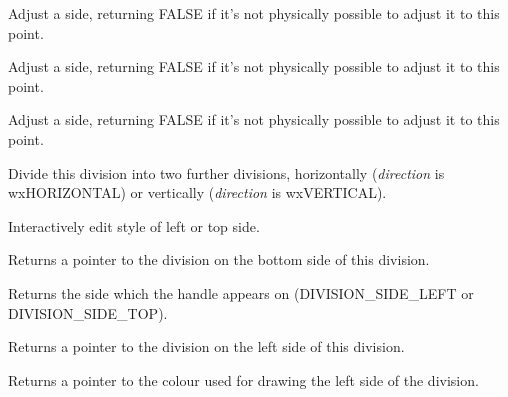 
Adjust a side, returning FALSE if it's not physically possible to adjust it to this point.



Adjust a side, returning FALSE if it's not physically possible to adjust it to this point.



Adjust a side, returning FALSE if it's not physically possible to adjust it to this point.

\label{wxdivisionshapedivide}


Divide this division into two further divisions, horizontally ({\it direction} is wxHORIZONTAL) or
vertically ({\it direction} is wxVERTICAL).



Interactively edit style of left or top side.



Returns a pointer to the division on the bottom side of this division.



Returns the side which the handle appears on (DIVISION\_SIDE\_LEFT or DIVISION\_SIDE\_TOP).



Returns a pointer to the division on the left side of this division.



Returns a pointer to the colour used for drawing the left side of the division.

